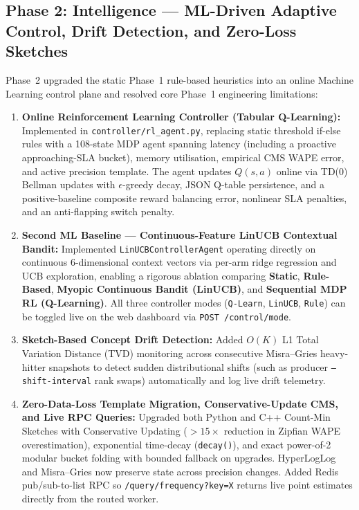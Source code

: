 \subsection{Phase 2: Intelligence — ML-Driven Adaptive Control, Drift Detection, and Zero-Loss Sketches}

Phase~2 upgraded the static Phase~1 rule-based heuristics into an online Machine Learning control plane and resolved core Phase~1 engineering limitations:

\begin{enumerate}
    \item \textbf{Online Reinforcement Learning Controller (Tabular Q-Learning):}
    Implemented in \texttt{controller/rl\_agent.py}, replacing static threshold if-else rules with a 108-state MDP agent spanning latency (including a proactive approaching-SLA bucket), memory utilisation, empirical CMS WAPE error, and active precision template. The agent updates $Q(s,a)$ online via TD(0) Bellman updates with $\epsilon$-greedy decay, JSON Q-table persistence, and a positive-baseline composite reward balancing error, nonlinear SLA penalties, and an anti-flapping switch penalty.

    \item \textbf{Second ML Baseline — Continuous-Feature LinUCB Contextual Bandit:}
    Implemented \texttt{LinUCBControllerAgent} operating directly on continuous 6-dimensional context vectors via per-arm ridge regression and UCB exploration, enabling a rigorous ablation comparing \textbf{Static}, \textbf{Rule-Based}, \textbf{Myopic Continuous Bandit (LinUCB)}, and \textbf{Sequential MDP RL (Q-Learning)}. All three controller modes (\texttt{Q-Learn}, \texttt{LinUCB}, \texttt{Rule}) can be toggled live on the web dashboard via \texttt{POST /control/mode}.

    \item \textbf{Sketch-Based Concept Drift Detection:}
    Added $O(K)$ L1 Total Variation Distance (TVD) monitoring across consecutive Misra--Gries heavy-hitter snapshots to detect sudden distributional shifts (such as producer \texttt{--shift-interval} rank swaps) automatically and log live drift telemetry.

    \item \textbf{Zero-Data-Loss Template Migration, Conservative-Update CMS, and Live RPC Queries:}
    Upgraded both Python and C++ Count-Min Sketches with Conservative Updating ($>15\times$ reduction in Zipfian WAPE overestimation), exponential time-decay (\texttt{decay()}), and exact power-of-2 modular bucket folding with bounded fallback on upgrades. HyperLogLog and Misra--Gries now preserve state across precision changes. Added Redis pub/sub-to-list RPC so \texttt{/query/frequency?key=X} returns live point estimates directly from the routed worker.


\end{enumerate}
